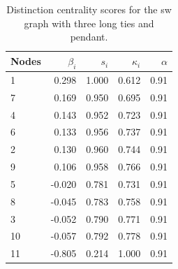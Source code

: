 \begin{table}
\centering
\caption{\label{tab:sw3p}Distinction centrality scores for the sw graph with three long ties and pendant.}
\centering
\begin{tabular}[t]{lrrrr}
\toprule
Nodes & $\beta_i$ & $s_i$ & $\kappa_i$ & $\alpha$\\
\midrule
1 & 0.298 & 1.000 & 0.612 & 0.91\\
7 & 0.169 & 0.950 & 0.695 & 0.91\\
4 & 0.143 & 0.952 & 0.723 & 0.91\\
6 & 0.133 & 0.956 & 0.737 & 0.91\\
2 & 0.130 & 0.960 & 0.744 & 0.91\\
9 & 0.106 & 0.958 & 0.766 & 0.91\\
5 & -0.020 & 0.781 & 0.731 & 0.91\\
8 & -0.045 & 0.783 & 0.758 & 0.91\\
3 & -0.052 & 0.790 & 0.771 & 0.91\\
10 & -0.057 & 0.792 & 0.778 & 0.91\\
11 & -0.805 & 0.214 & 1.000 & 0.91\\
\bottomrule
\end{tabular}
\end{table}
